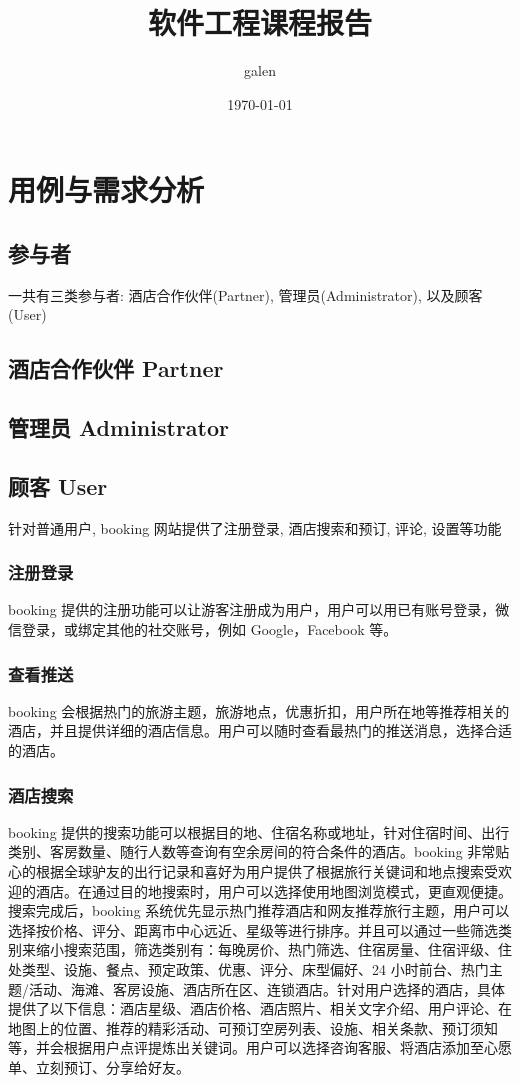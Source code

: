 \documentclass[11pt]{article}
\begin{document}
\tableofcontents
\title{软件工程课程报告}
\author{galen}
\date{\today}
\maketitle


\section{用例与需求分析}
	\subsection{参与者}
	一共有三类参与者: 酒店合作伙伴(Partner), 管理员(Administrator), 以及顾客(User)
	\subsection{酒店合作伙伴 Partner}
		
	\subsection{管理员 Administrator}
		
	\subsection{顾客 User}
		针对普通用户, booking 网站提供了注册登录, 酒店搜索和预订, 评论, 设置等功能
		\subsubsection{注册登录}
		booking 提供的注册功能可以让游客注册成为用户，用户可以用已有账号登录，微信登录，或绑定其他的社交账号，例如 Google，Facebook 等。
		\subsubsection{查看推送}
		booking 会根据热门的旅游主题，旅游地点，优惠折扣，用户所在地等推荐相关的酒店，并且提供详细的酒店信息。用户可以随时查看最热门的推送消息，选择合适的酒店。
		\subsubsection{酒店搜索}
		booking 提供的搜索功能可以根据目的地、住宿名称或地址，针对住宿时间、出行类别、客房数量、随行人数等查询有空余房间的符合条件的酒店。booking 非常贴心的根据全球驴友的出行记录和喜好为用户提供了根据旅行关键词和地点搜索受欢迎的酒店。在通过目的地搜索时，用户可以选择使用地图浏览模式，更直观便捷。搜索完成后，booking 系统优先显示热门推荐酒店和网友推荐旅行主题，用户可以选择按价格、评分、距离市中心远近、星级等进行排序。并且可以通过一些筛选类别来缩小搜索范围，筛选类别有：每晚房价、热门筛选、住宿房量、住宿评级、住处类型、设施、餐点、预定政策、优惠、评分、床型偏好、24 小时前台、热门主题/活动、海滩、客房设施、酒店所在区、连锁酒店。针对用户选择的酒店，具体提供了以下信息：酒店星级、酒店价格、酒店照片、相关文字介绍、用户评论、在地图上的位置、推荐的精彩活动、可预订空房列表、设施、相关条款、预订须知等，并会根据用户点评提炼出关键词。用户可以选择咨询客服、将酒店添加至心愿单、立刻预订、分享给好友。
\end{document}
